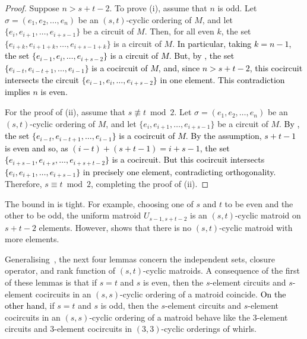 \documentclass[11pt]{amsart}
\newcommand{\bloo}{\textcolor{black}}
\begin{document}
\begin{proof}
Suppose $n > s+t-2$. To prove (i), assume that $n$ is odd. Let $\left.\sigma = (e_1, e_2, \ldots, e_n)\right.$ be an $(s, t)$-cyclic ordering of $M$, and let $\{e_i, e_{i+1}, \ldots, e_{i+s-1}\}$ be a circuit of $M$. Then, for all even $k$, the set $\{e_{i+k}, e_{i+1+k}, \ldots, e_{i+s-1+k}\}$ is a circuit of $M$. \bloo{In particular, taking $k=n-1$, the set $\{e_{i-1}, e_i, \ldots, e_{i+s-2}\}$ is a circuit of $M$. But, by , the set $\{e_{i-t},e_{i-t+1},\ldots,e_{i-1}\}$ is a cocircuit of $M$, and, since $n > s+t-2$, this cocircuit intersects the circuit $\{e_{i-1},e_i,\ldots,e_{i+s-2}\}$ in one element. This contradiction implies $n$ is even.}

For the proof of (ii), assume that $s \not\equiv t \bmod{2}$. Let $\sigma=(e_1, e_2, \ldots, e_n)$ be an $(s, t)$-cyclic ordering of $M$, and let $\{e_i, e_{i+1}, \ldots, e_{i+s-1}\}$ be a circuit of $M$. \bloo{By , the set $\{e_{i-t},e_{i-t+1},\ldots,e_{i-1}\}$ is a cocircuit of $M$. By the assumption, $s+t-1$ is even and so, as $(i-t)+(s+t-1)=i+s-1$, the set $\{e_{i+s-1},e_{i+s},\ldots,e_{i+s+t-2}\}$ is a cocircuit. But this cocircuit intersects $\{e_i, e_{i+1}, \ldots, e_{i+s-1}\}$ in precisely one element, contradicting orthogonality.} Therefore, $s \equiv t \bmod{2}$, completing the proof of (ii).
\end{proof}

The bound in  is tight. For example, choosing one of $s$ and $t$ to be even and the other to be odd, the uniform matroid $U_{s-1, s+t-2}$ is an $(s, t)$-cyclic matroid on $s+t-2$ elements. However,  shows that there is no $(s, t)$-cyclic matroid with more elements.

Generalising~\cite[Lemma~4.3, Lemma~5.1, Lemma~5.3]{bre19b}, the next four lemmas concern the independent sets, closure operator, and rank function of $(s, t)$-cyclic matroids. A consequence of the first of these lemmas is that if $s=t$ and $s$ is even, then the $s$-element circuits and $s$-element cocircuits in an $(s, s)$-cyclic ordering of a matroid coincide. \bloo{On the other hand}, if $s=t$ and $s$ is odd, then the $s$-element circuits and $s$-element cocircuits in an $(s, s)$-cyclic ordering of a matroid behave like the $3$-element circuits and $3$-element cocircuits in $(3, 3)$-cyclic orderings of whirls.
\end{document}
